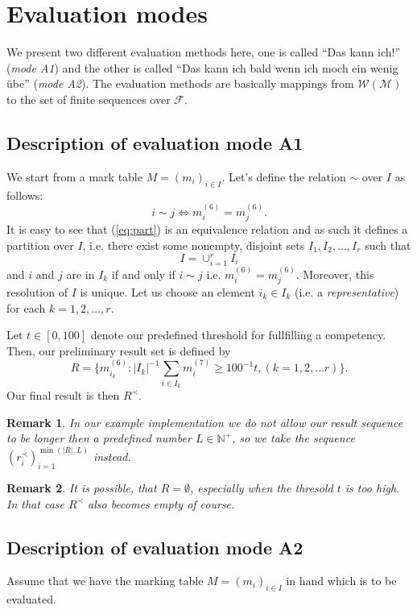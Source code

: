 \documentclass{scrartcl}
\newtheorem{remark}{Remark}
\begin{document}
\section{Evaluation modes}
We present two different evaluation methods here, one is called ``Das kann ich!'' (\emph{mode A1}) and the other is called ``Das kann ich bald wenn ich moch ein wenig übe'' (\emph{mode A2}). The evaluation methods are basically mappings from $\mathcal{W}({\mathcal{M}})$ to the set of finite sequences over $\mathcal{F}$.

\subsection{Description of evaluation mode A1}
We start from a mark table $M=(m_i)_{i\in I}$. Let's define the relation $\sim$ over $I$ as follows:
\begin{equation}
i\sim j \Leftrightarrow m_i^{(6)}=m_j^{(6)}.
\label{eq:part}
\end{equation}
It is easy to see that (\ref{eq:part}) is an equivalence relation and as such it defines a partition over $I$, i.e. there exist some nonempty, disjoint sets $I_1,I_2,\ldots,I_r$ such that $$I=\cup_{i=1}^r I_i$$ and $i$ and $j$ are in $I_k$ if and only if $i\sim j$ i.e. $m_i^{(6)}=m_j^{(6)}$. Moreover, this resolution of $I$ is unique. Let us choose an element $i_k\in I_k$ (i.e. a \emph{representative}) for each $k=1,2,\ldots,r$.

Let $t\in [0,100]$ denote our predefined threshold for fullfilling a competency. Then, our preliminary result set is defined by 
$$R=\{m_{i_k}^{(6)}: |I_k|^{-1}\sum_{i \in I_k}m_{i}^{(7)}\geq 100^{-1}t, (k=1,2,\ldots r)\}.$$
Our final result is then $R^{\prec}$.
\begin{remark}
In our example implementation we do not allow our result sequence to be longer then a predefined number $L\in\mathbb{N}^+$, so we take the sequence $(r^{\prec}_i)_{i=1}^{\min(|R|,L)}$ instead.    
\end{remark}

\begin{remark}
It is possible, that $R=\emptyset$, especially when the thresold $t$ is too high. In that case $R^{\prec}$ also becomes empty of course.
\end{remark}

\subsection{Description of evaluation mode A2}
Assume that we have the marking table $M=(m_i)_{i\in I}$ in hand which is to be evaluated.
\end{document}

